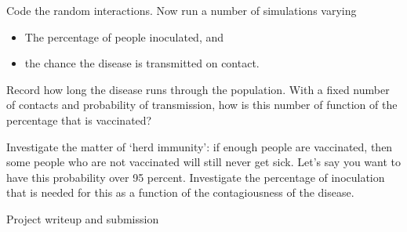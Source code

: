 \begin{exercise}
  \label{ex:infect:3}
  Code the random interactions. Now run a number of simulations varying
  \begin{itemize}
  \item The percentage of people inoculated, and
  \item the chance the disease is transmitted on contact.
  \end{itemize}
  Record how long the disease runs through the population. With a
  fixed number of contacts and probability of transmission, how is
  this number of function of the percentage that is vaccinated?

  Investigate the matter of `herd immunity': if enough people are
  vaccinated, then some people who are not vaccinated will still never get
  sick. Let's say you want to have this probability over 95
  percent. Investigate the percentage of inoculation that is needed
  for this as a function of the contagiousness of the disease.
\end{exercise}
\begin{comment}
\begin{verbatim}
for p in 0 10 25 50 75 90 95 98 ; do (echo 400 ; echo .2 ; echo $p ) 
    | ./infect3 ; done


An inoculation percentage of 0 leads to a maximum number of infected
of 17052 or 42.6325 percent
The disease ran its course in 38 days
susceptible people unaffected: 17295 out of 40000

An inoculation percentage of 10 leads to a maximum number of infected
of 14719 or 36.8 percent
The disease ran its course in 36 days
susceptible people unaffected: 15797 out of 36043

An inoculation percentage of 25 leads to a maximum number of infected
of 10823 or 27.06 percent
The disease ran its course in 37 days
susceptible people unaffected: 13576 out of 29993

An inoculation percentage of 50 leads to a maximum number of infected
of 5075 or 12.69 percent
The disease ran its course in 52 days
susceptible people unaffected: 9925 out of 20017

An inoculation percentage of 75 leads to a maximum number of infected
of   0 or 0.0025 percent
The disease ran its course in 6 days
susceptible people unaffected: 9922 out of 9922

An inoculation percentage of 90 leads to a maximum number of infected
of   0 or 0.0025 percent
The disease ran its course in 6 days
susceptible people unaffected: 3971 out of 3971

An inoculation percentage of 95 leads to a maximum number of infected
of   0 or 0.0025 percent
The disease ran its course in 6 days
susceptible people unaffected: 1990 out of 1990

An inoculation percentage of 98 leads to a maximum number of infected
of   0 or 0.0025 percent
The disease ran its course in 6 days
susceptible people unaffected: 843 out of 843
\end{verbatim}
\end{comment}
 {Project writeup and submission}

